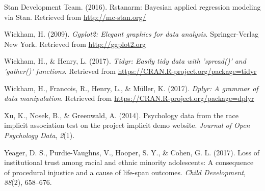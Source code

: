 \documentclass[english,floatsintext,man]{apa6}
\theoremstyle{definition}
\theoremstyle{definition}
\theoremstyle{remark}
\begin{document}
\hypertarget{ref-rstanarm2016}{}
Stan Development Team. (2016). Rstanarm: Bayesian applied regression
modeling via Stan. Retrieved from \url{http://mc-stan.org/}

\hypertarget{ref-wickham2009ggplot2}{}
Wickham, H. (2009). \emph{Ggplot2: Elegant graphics for data analysis}.
Springer-Verlag New York. Retrieved from \url{http://ggplot2.org}

\hypertarget{ref-wickham2017tidyr}{}
Wickham, H., \& Henry, L. (2017). \emph{Tidyr: Easily tidy data with
'spread()' and 'gather()' functions}. Retrieved from
\url{https://CRAN.R-project.org/package=tidyr}

\hypertarget{ref-wickham2017dplyr}{}
Wickham, H., Francois, R., Henry, L., \& Müller, K. (2017). \emph{Dplyr:
A grammar of data manipulation}. Retrieved from
\url{https://CRAN.R-project.org/package=dplyr}

\hypertarget{ref-xu2014psychology}{}
Xu, K., Nosek, B., \& Greenwald, A. (2014). Psychology data from the
race implicit association test on the project implicit demo website.
\emph{Journal of Open Psychology Data}, \emph{2}(1).

\hypertarget{ref-yeager2017loss}{}
Yeager, D. S., Purdie-Vaughns, V., Hooper, S. Y., \& Cohen, G. L.
(2017). Loss of institutional trust among racial and ethnic minority
adolescents: A consequence of procedural injustice and a cause of
life-span outcomes. \emph{Child Development}, \emph{88}(2), 658--676.
\end{document}
